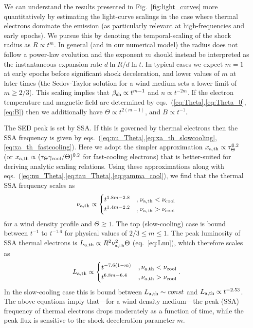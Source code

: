 \documentclass[twocolumn]{aastex63}
\begin{document}
We can understand the results presented in Fig.~\ref{fig:light_curves} more quantitatively by estimating the light-curve scalings in the case where thermal electrons dominate the emission (as particularly relevant at high-frequencies and early epochs).
We pursue this by denoting the temporal-scaling of the shock radius as $R \propto t^m$. 
In general (and in our numerical model) the radius does not follow a power-law evolution and the exponent $m$ should instead be interpreted as the instantaneous expansion rate $d\ln R/d\ln t$. In typical cases we expect $m=1$ at early epochs before significant shock deceleration, and lower values of $m$ at later times (the Sedov-Taylor solution for a wind medium sets a lower limit of $m \geq 2/3$).
This scaling implies that $\beta_{\rm sh} \propto t^{m-1}$ and $n \propto t^{-2m}$.
If the electron temperature and magnetic field are determined by eqs.~(\ref{eq:Theta},\ref{eq:Theta_0},\ref{eq:B}) then we additionally have $\Theta \propto t^{2(m-1)}$, and $B \propto t^{-1}$.

The SED peak is set by SSA. If this is governed by thermal electrons then the SSA frequency is given by eqs.~(\ref{eq:nu_Theta},\ref{eq:xa_th_slowcooling},\ref{eq:xa_th_fastcooling}). Here we adopt the simpler approximation $x_{\rm a,th} \propto \tau_\Theta^{0.2}$ (or $x_{\rm a,th} \propto (\tau_\Theta \gamma_{\rm cool}/\Theta)^{0.2}$ for fast-cooling electrons) that is better-suited for deriving analytic scaling relations.
Using these approximations along with eqs.~(\ref{eq:nu_Theta},\ref{eq:tau_Theta},\ref{eq:gamma_cool}), we find that the thermal SSA frequency scales as
\begin{equation}
\label{eq:nua_th_scaling}
    \nu_{\rm a,th} \propto
    \begin{cases}
    t^{1.8m-2.8} &, 
    \nu_{\rm a,th} < \nu_{\rm cool}
    \\
    t^{1.4m-2.2} &, 
    \nu_{\rm a,th} > \nu_{\rm cool}
    \end{cases}
\end{equation}
for a wind density profile and $\Theta \gtrsim 1$.
The top (slow-cooling) case is bound between $t^{-1}$ to $t^{-1.6}$ for physical values of $2/3 \leq m \leq 1$.
The peak luminosity of SSA thermal electrons is $L_{\rm a,th} \propto R^2 \nu_{\rm a,th}^2 \Theta$ (eq.~\ref{eq:Lnu}), which therefore scales as 
\begin{equation}
\label{eq:La_th_scaling}
    L_{\rm a,th} \propto
    \begin{cases}
    t^{-7.6 (1-m)} &, \nu_{\rm a,th} < \nu_{\rm cool}
    \\
    t^{6.8m-6.4} &, \nu_{\rm a,th} > \nu_{\rm cool}
    \end{cases}
    .
\end{equation}
In the slow-cooling case this is bound between $L_{\rm a,th} \sim const$ and $L_{\rm a,th} \propto t^{-2.53}$.
The above equations imply that---for a wind density medium---the peak (SSA) frequency of thermal electrons drops moderately as a function of time, while the peak flux is sensitive to the shock deceleration parameter $m$.
\end{document}
